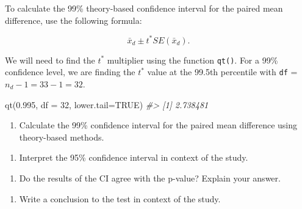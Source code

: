 \documentclass[
]{report}
\newenvironment{Shaded}{\begin{snugshade}}{\end{snugshade}}
\newcommand{\AttributeTok}[1]{\textcolor[rgb]{0.77,0.63,0.00}{#1}}
\newcommand{\CommentTok}[1]{\textcolor[rgb]{0.56,0.35,0.01}{\textit{#1}}}
\newcommand{\ConstantTok}[1]{\textcolor[rgb]{0.00,0.00,0.00}{#1}}
\newcommand{\DecValTok}[1]{\textcolor[rgb]{0.00,0.00,0.81}{#1}}
\newcommand{\FloatTok}[1]{\textcolor[rgb]{0.00,0.00,0.81}{#1}}
\newcommand{\FunctionTok}[1]{\textcolor[rgb]{0.00,0.00,0.00}{#1}}
\newcommand{\NormalTok}[1]{#1}
\providecommand{\tightlist}{%
  \setlength{\itemsep}{0pt}\setlength{\parskip}{0pt}}
\begin{document}
\vspace{0.5in}

To calculate the 99\% theory-based confidence interval for the paired mean difference, use the following formula:

\[\bar{x}_d\pm t^* SE(\bar{x}_d).\]

We will need to find the \(t^*\) multiplier using the function \texttt{qt()}. For a 99\% confidence level, we are finding the \(t^*\) value at the 99.5th percentile with \texttt{df} = \(n_d - 1 = 33 - 1 = 32\).

\begin{Shaded}
\begin{Highlighting}[]
\FunctionTok{qt}\NormalTok{(}\FloatTok{0.995}\NormalTok{, }\AttributeTok{df =} \DecValTok{32}\NormalTok{, }\AttributeTok{lower.tail=}\ConstantTok{TRUE}\NormalTok{)}
\CommentTok{\#\textgreater{} [1] 2.738481}
\end{Highlighting}
\end{Shaded}

\begin{enumerate}
\def\labelenumi{\arabic{enumi}.}
\setcounter{enumi}{4}
\tightlist
\item
  Calculate the 99\% confidence interval for the paired mean difference using theory-based methods.
\end{enumerate}

\vspace{1in}

\begin{enumerate}
\def\labelenumi{\arabic{enumi}.}
\setcounter{enumi}{14}
\tightlist
\item
  Interpret the 95\% confidence interval in context of the study.
\end{enumerate}

\vspace{1in}

\begin{enumerate}
\def\labelenumi{\arabic{enumi}.}
\setcounter{enumi}{15}
\tightlist
\item
  Do the results of the CI agree with the p-value? Explain your answer.
\end{enumerate}

\vspace{0.5in}

\begin{enumerate}
\def\labelenumi{\arabic{enumi}.}
\setcounter{enumi}{16}
\tightlist
\item
  Write a conclusion to the test in context of the study.
  \vspace{0.8in}
\end{enumerate}
\end{document}
